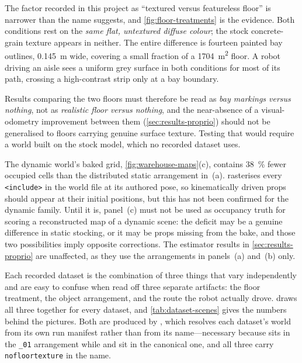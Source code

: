\begin{queried}[Naming]
The factor recorded in this project as ``textured versus featureless floor'' is
narrower than the name suggests, and \cref{fig:floor-treatments} is the evidence.
Both conditions rest on the \emph{same flat, untextured diffuse colour}; the stock
concrete-grain texture appears in neither. The entire difference is fourteen
painted bay outlines, \SI{0.145}{\metre} wide, covering a small fraction of a
\SI{1704}{\metre\squared} floor. A robot driving an aisle sees a uniform grey
surface in both conditions for most of its path, crossing a high-contrast strip
only at a bay boundary.

Results comparing the two floors must therefore be read as \emph{bay markings
versus nothing}, not as \emph{realistic floor versus nothing}, and the near-absence
of a visual-odometry improvement between them (\cref{sec:results-proprio}) should
not be generalised to floors carrying genuine surface texture. Testing that would
require a world built on the stock  model, which no recorded
dataset uses.
\end{queried}

\begin{queried}[Unverified]
The dynamic world's baked grid, \cref{fig:warehouse-maps}(c), contains
\SI{38}{\percent} fewer occupied cells than the distributed static arrangement
in~(a).  rasterises every \texttt{<include>} in the
world file at its authored pose, so kinematically driven props should appear at
their initial positions, but this has not been confirmed for the dynamic family.
Until it is, panel~(c) must not be used as occupancy truth for scoring a
reconstructed map of a dynamic scene: the deficit may be a genuine difference in
static stocking, or it may be props missing from the bake, and those two
possibilities imply opposite corrections. The estimator results in
\cref{sec:results-proprio} are unaffected, as they use the arrangements in
panels~(a) and~(b) only.
\end{queried}

Each recorded dataset is the combination of three things that vary independently
and are easy to confuse when read off three separate artifacts: the floor
treatment, the object arrangement, and the route the robot actually drove.
 draws all three together for every dataset, and
\cref{tab:dataset-scenes} gives the numbers behind the pictures. Both are produced
by , which resolves each dataset's world from
its own run manifest rather than from its name---necessary because
 sits in the \texttt{\_01} arrangement
while  and  sit in the canonical one, and all three carry
\texttt{nofloortexture} in the name.

